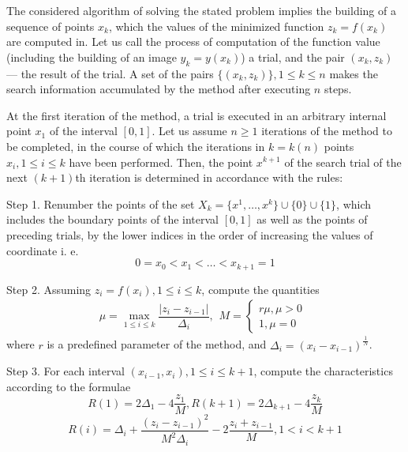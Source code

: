\documentclass[procedia]{easychair}
\begin{document}
The considered algorithm of solving the stated problem implies the building of
a sequence of points \(x_k\), which the values of the minimized function \(z_k = f(x_k)\)
are computed in. Let us call the process of computation of the function value
(including the building of an image \(y_k=y(x_k)\)) a trial, and the pair \((x_k,z_k)\) ---
the result of the trial. A set of the pairs \(\{(x_k,z_k)\}, 1\leqslant k\leqslant n\)
makes the search information accumulated by the method after executing \(n\) steps.
\par
At the first iteration of the method, a trial is executed in an arbitrary internal
point \(x_1\) of the interval \([0,1]\). Let us assume \(n \geqslant 1\) iterations
of the method to be completed, in the course of which the iterations in \(k = k(n)\)
points \(x_i, 1\leqslant i\leqslant k\) have been performed. Then, the point \(x^{k+1}\)
of the search trial of the next \((k+1)\)th iteration is determined in accordance with the rules:
\par
Step 1. Renumber the points of the set \(X_k=\{x^1,\dotsc,x^k\}\cup\{0\}\cup\{1\}\),
which includes the boundary points of the interval \([0,1]\) as well as the points of
preceding trials, by the lower indices in the order of increasing the values of coordinate i. e.
\begin{displaymath}
0=x_0<x_1<\dotsc<x_{k+1}=1
\end{displaymath}
\par
Step 2. Assuming \(z_i=f(x_i),1\leqslant i\leqslant k\), compute the quantities
\begin{equation}
\label{step2}
\mu=\max_{1\leqslant i\leqslant k}\dfrac{|z_i-z_{i-1}|}{\Delta_i},
\begin{matrix}
    M =
    \left\{
    \begin{matrix}
    r\mu,\mu>0 \\
    1,\mu=0
    \end{matrix} \right.
    \end{matrix}
\end{equation}
where \(r\) is a predefined parameter of the method, and \(\Delta_i=(x_i-x_{i-1})^\frac{1}{N}\).
\par
Step 3. For each interval \((x_{i-1},x_i),1\leqslant i\leqslant k+1\), compute the
characteristics according to the formulae
\begin{equation}
\label{step3_1}
R(1)=2\Delta_1-4\dfrac{z_1}{M},R(k+1)=2\Delta_{k+1}-4\dfrac{z_k}{M}
\end{equation}
\begin{equation}
\label{step3_2}
R(i)=\Delta_i+\dfrac{(z_i-z_{i-1})^2}{M^2\Delta_i}-2\dfrac{z_i+z_{i-1}}{M},1<i<k+1
\end{equation}
\end{document}
